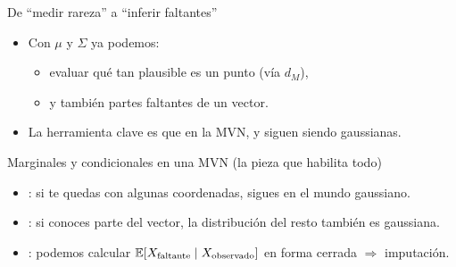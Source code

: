 \begin{frame}{De “medir rareza” a “inferir faltantes”}
\begin{itemize}
  \item Con \(\mu\) y \(\Sigma\) ya podemos:
  \begin{itemize}
    \item evaluar qué tan plausible es un punto (vía \(d_M\)),
    \item y también  partes faltantes de un vector.
  \end{itemize}
  \item La herramienta clave es que en la MVN,  y  siguen siendo gaussianas.
\end{itemize}
\end{frame}

\begin{frame}{Marginales y condicionales en una MVN (la pieza que habilita todo)}
\begin{itemize}
  \item {}: si te quedas con algunas coordenadas, sigues en el mundo gaussiano.
  \item {}: si conoces parte del vector, la distribución del resto también es gaussiana.
  \item {}: podemos calcular \(\mathbb{E}[X_{\text{faltante}}\mid X_{\text{observado}}]\) en forma cerrada \(\Rightarrow\) imputación.
\end{itemize}
\end{frame}

